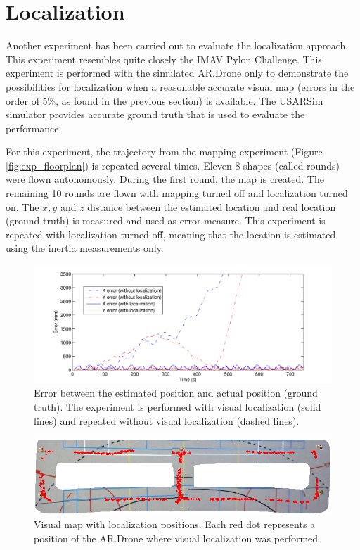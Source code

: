 	\section{Localization}
Another experiment has been carried out to evaluate the localization approach.
This experiment resembles quite closely the IMAV Pylon Challenge. This experiment is performed with the simulated AR.Drone only to demonstrate the possibilities for localization when a reasonable accurate visual map (errors in the order of 5\%, as found in the previous section) is available. 
The USARSim simulator provides accurate ground truth that is used to evaluate the performance.

For this experiment, the trajectory from the mapping experiment (Figure \ref{fig:exp_floorplan}) is repeated several times.
Eleven 8-shapes (called rounds) were flown autonomously.
During the first round, the map is created.
The remaining 10 rounds are flown with mapping turned off and localization turned on.
The $x, y$ and $z$ distance between the estimated location and real location (ground truth) is measured and used as error measure.
This experiment is repeated with localization turned off, meaning that the location is estimated using the inertia measurements only.

\begin{figure}[htb!]
\centering
\includegraphics[width=14cm]{images/error_loc-eps-converted-to.pdf}
\caption{Error between the estimated position and actual position (ground truth). The experiment is performed  with visual localization (solid lines) and repeated without visual localization (dashed lines).}
\label{fig:res_localization_error}
\end{figure}

\begin{figure}[htb!]
\centering
\includegraphics[width=14.0cm]{images/ardrone_map_loc_positions.png}
\caption{Visual map with localization positions. Each red dot represents a position of the AR.Drone where visual localization was performed.}
\label{fig:res_loc_positions}
\end{figure}

